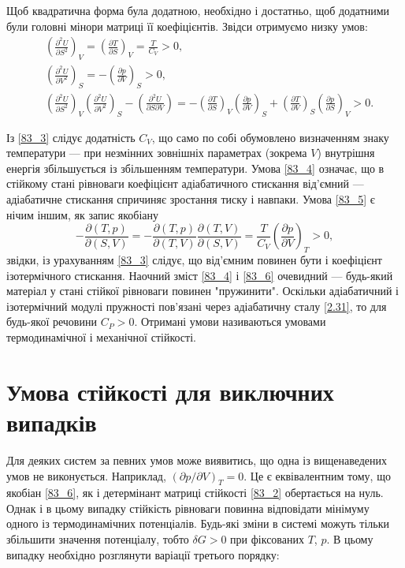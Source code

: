 Щоб квадратична форма була додатною, необхідно і достатньо, щоб додатними були головні мінори матриці її коефіцієнтів. Звідси отримуємо низку умов:
\begin{align}
&\left(\frac{\partial^2 U}{\partial S^2}\right)_V = \left(\frac{\partial T}{\partial S}\right)_V = \frac{T}{C_V} > 0, \label{83_3}\\
&\left(\frac{\partial^2 U}{\partial V^2}\right)_S = -\left(\frac{\partial p}{\partial V}\right)_S > 0,  \label{83_4}\\
&\left(\frac{\partial^2 U}{\partial S^2}\right)_V \left(\frac{\partial^2 U}{\partial V^2}\right)_S - \left(\frac{\partial^2 U}{\partial S \partial V}\right) = -\left(\frac{\partial T}{\partial S}\right)_V \left(\frac{\partial p}{\partial V}\right)_S + \left(\frac{\partial T}{\partial V}\right)_S \left(\frac{\partial p}{\partial S}\right)_V > 0.  \label{83_5}
\end{align}

Із \eqref{83_3} слідує додатність $C_V$, що само по собі обумовлено визначенням знаку температури --- при незмінних зовнішніх параметрах (зокрема $V$) внутрішня енергія збільшується із збільшенням температури. Умова \eqref{83_4} означає, що в стійкому стані рівноваги коефіцієнт адіабатичного стискання від'ємний --- адіабатичне стискання спричиняє зростання тиску і навпаки. Умова \eqref{83_5} є нічим іншим, як запис якобіану
\begin{equation}\label{83_6}
-\frac{\partial (T,p)}{\partial (S,V)} = -\frac{\partial (T,p)}{\partial (T,V)} \frac{\partial (T,V)}{\partial (S,V)} = \frac{T}{C_V} \left(\frac{\partial p}{\partial V}\right)_T > 0,
\end{equation}
%
звідки, із урахуванням \eqref{83_3} слідує, що від'ємним повинен бути і коефіцієнт ізотермічного стискання. Наочний зміст \eqref{83_4} і \eqref{83_6} очевидний --- будь-який матеріал у стані стійкої рівноваги повинен "пружинити". Оскільки адіабатичний і ізотермічний модулі пружності пов'язані через адіабатичну сталу \eqref{2.31}, то для будь-якої речовини $C_P > 0$. Отримані умови називаються умовами термодинамічної і механічної стійкості.

\section{Умова стійкості для виключних випадків}

Для деяких систем за певних умов може виявитись, що одна із вищенаведених умов не виконується. Наприклад, $(\partial p / \partial V)_T = 0$. Це є еквівалентним тому, що якобіан \eqref{83_6}, як і детермінант матриці стійкості \eqref{83_2} обертається на нуль. Однак і в цьому випадку стійкість рівноваги повинна відповідати мінімуму одного із термодинамічних потенціалів. Будь-які зміни в системі можуть тільки збільшити значення потенціалу, тобто $\delta G > 0$ при фіксованих $T$, $p$. В цьому випадку необхідно розглянути варіації третього порядку:

